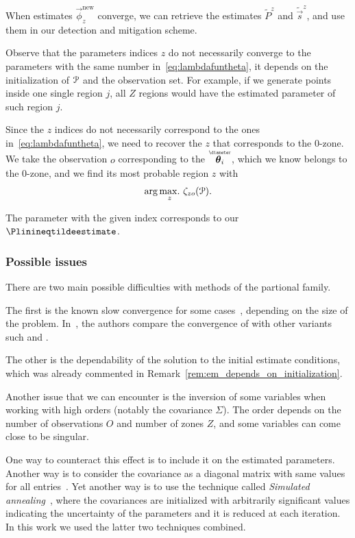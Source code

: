\documentclass[../main.tex]{subfiles}
\begin{document}
When estimates $\vec{\phi}_{z}^{\mathrm{new}}$ converge, we can retrieve the estimates $\tilde{P}^{z}$ and $\tilde{\vec{s}}^{z}$, and use them in our detection and mitigation scheme.

\begin{remark}
  Observe that the parameters indices $z$ do not necessarily converge to the parameters with the same number in~\eqref{eq:lambdafuntheta}, it depends on the initialization of $\mathcal{P}$ and the observation set.
  For example, if we generate points inside one single region $j$, all $Z$ regions would have the estimated parameter of such region $j$.
\end{remark}

Since the $z$ indices do not necessarily correspond to the ones in~\eqref{eq:lambdafuntheta}, we need to recover the $z$ that corresponds to the $0$-zone.
We take the observation $o$ corresponding to the $\thetairestricted$, which we know belongs to the $0$-zone, and we find its most probable region $z$ with
\begin{equation*}\label{eq:argmaxz}
  \arg\underset{z}{\max\!.}\ {\zeta_{zo}(\mathcal{P})}.
\end{equation*}

The parameter with the given index corresponds to our $\Plinineqtildeestimate$.

\subsubsection{Possible issues}

There are two main possible difficulties with methods of the partional family.

The first is the known slow convergence for some cases~\cite{CeleuxGovaert1992,Bishop2006,BaudryCeleux2015}, depending on the size of the problem. In~\cite{FariaSoromenho2010}, the authors compare the convergence of \EM{} with other variants such \sEM{} and \CEM{}.

The other is the dependability of the solution to the initial estimate conditions, which was already commented in Remark~\ref{rem:em_depends_on_initialization}.

Another issue that we can encounter is the inversion of some variables when working with high orders (notably the covariance $\Sigma$).
The order depends on the number of observations $O$ and number of zones $Z$, and some variables can come close to be singular.

One way to counteract this effect is to include it on the estimated parameters.
Another way is to consider the covariance as a diagonal matrix with same values for all entries~\cite{KarlisXekalaki2003}.
Yet another way is to use the technique called \emph{Simulated annealing}~\cite{CeleuxGovaert1992,OzerovFevotte2010}, where the covariances are initialized with arbitrarily significant values indicating the uncertainty of the parameters and it is reduced at each iteration.
In this work we used the latter two techniques combined.
\end{document}
